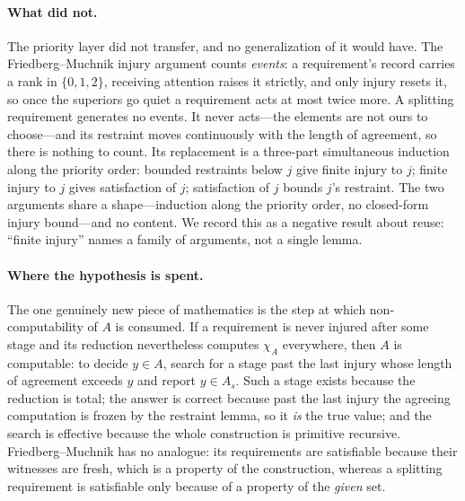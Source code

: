 \paragraph{What did not.}
The priority layer did not transfer, and no generalization of it would
have.  The Friedberg--Muchnik injury argument counts \emph{events}: a
requirement's record carries a rank in $\{0,1,2\}$, receiving attention
raises it strictly, and only injury resets it, so once the superiors go
quiet a requirement acts at most twice more.  A splitting requirement
generates no events.  It never acts---the elements are not ours to
choose---and its restraint moves continuously with the length of
agreement, so there is nothing to count.  Its replacement is a three-part
simultaneous induction along the priority order: bounded restraints below
$j$ give finite injury to $j$; finite injury to $j$ gives satisfaction of
$j$; satisfaction of $j$ bounds $j$'s restraint.  The two arguments share a
shape---induction along the priority order, no closed-form injury
bound---and no content.  We record this as a negative result about
reuse: ``finite injury'' names a family of arguments, not a single lemma.

\paragraph{Where the hypothesis is spent.}
The one genuinely new piece of mathematics is the step at which
non-computability of $A$ is consumed.  If a requirement is never injured
after some stage and its reduction nevertheless computes $\chi_A$
everywhere, then $A$ is computable: to decide $y \in A$, search for a stage
past the last injury whose length of agreement exceeds $y$ and report
$y \in A_s$.  Such a stage exists because the reduction is total; the
answer is correct because past the last injury the agreeing computation is
frozen by the restraint lemma, so it \emph{is} the true value; and the
search is effective because the whole construction is primitive recursive.
Friedberg--Muchnik has no analogue: its requirements are satisfiable
because their witnesses are fresh, which is a property of the
construction, whereas a splitting requirement is satisfiable only because
of a property of the \emph{given} set.

